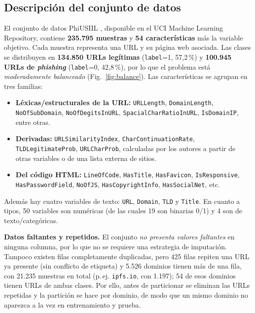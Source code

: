 \documentclass[journal]{IEEEtran}
\begin{document}
\subsection{Descripción del conjunto de datos}
El conjunto de datos PhiUSIIL \cite{prasad2024}, disponible en el UCI Machine Learning
Repository, contiene \textbf{235.795 muestras} y \textbf{54 características} más la variable
objetivo. Cada muestra representa una URL y su página web asociada. Las clases se distribuyen en
\textbf{134.850 URLs legítimas} (\texttt{label}=1, 57,2\,\%) y \textbf{100.945 URLs de
\textit{phishing}} (\texttt{label}=0, 42,8\,\%), por lo que el problema está
\emph{moderadamente balanceado} (Fig.~\ref{fig:balance}). Las características se agrupan en tres
familias:
\begin{itemize}
  \item \textbf{Léxicas/estructurales de la URL:} \texttt{URLLength}, \texttt{DomainLength},
        \texttt{NoOfSubDomain}, \texttt{NoOfDegitsInURL}, \texttt{SpacialCharRatioInURL},
        \texttt{IsDomainIP}, entre otras.
  \item \textbf{Derivadas:} \texttt{URLSimilarityIndex}, \texttt{CharContinuationRate},
        \texttt{TLDLegitimateProb}, \texttt{URLCharProb}, calculadas por los autores a partir
        de otras variables o de una lista externa de sitios.
  \item \textbf{Del código HTML:} \texttt{LineOfCode}, \texttt{HasTitle}, \texttt{HasFavicon},
        \texttt{IsResponsive}, \texttt{HasPasswordField}, \texttt{NoOfJS},
        \texttt{HasCopyrightInfo}, \texttt{HasSocialNet}, etc.
\end{itemize}
Además hay cuatro variables de texto: \texttt{URL}, \texttt{Domain}, \texttt{TLD} y
\texttt{Title}. En cuanto a tipos, 50 variables son numéricas (de las cuales 19 son binarias
0/1) y 4 son de texto/categóricas.

\textbf{Datos faltantes y repetidos.} El conjunto \emph{no presenta valores faltantes} en
ninguna columna, por lo que no se requiere una estrategia de imputación. Tampoco existen filas
completamente duplicadas, pero 425 filas repiten una URL ya presente (sin conflicto de etiqueta)
y 5.526 dominios tienen más de una fila, con 21.235 muestras en total (p.\,ej.
\texttt{ipfs.io}, con 1.197); 54 de esos dominios tienen URLs de ambas clases. Por ello, antes de
particionar se eliminan las URLs repetidas y la partición se hace por dominio, de modo que un
mismo dominio no aparezca a la vez en entrenamiento y prueba.
\end{document}
